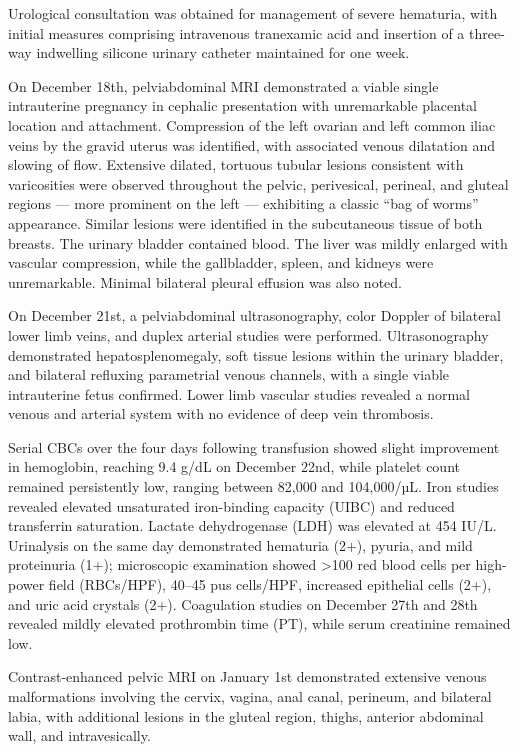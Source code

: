 \documentclass[
  letterpaper,
  DIV=11,
  numbers=noendperiod]{scrartcl}
\begin{document}
Urological consultation was obtained for management of severe hematuria,
with initial measures comprising intravenous tranexamic acid and
insertion of a three-way indwelling silicone urinary catheter maintained
for one week.

On December 18th, pelviabdominal MRI demonstrated a viable single
intrauterine pregnancy in cephalic presentation with unremarkable
placental location and attachment. Compression of the left ovarian and
left common iliac veins by the gravid uterus was identified, with
associated venous dilatation and slowing of flow. Extensive dilated,
tortuous tubular lesions consistent with varicosities were observed
throughout the pelvic, perivesical, perineal, and gluteal regions ---
more prominent on the left --- exhibiting a classic ``bag of worms''
appearance. Similar lesions were identified in the subcutaneous tissue
of both breasts. The urinary bladder contained blood. The liver was
mildly enlarged with vascular compression, while the gallbladder,
spleen, and kidneys were unremarkable. Minimal bilateral pleural
effusion was also noted.

On December 21st, a pelviabdominal ultrasonography, color Doppler of
bilateral lower limb veins, and duplex arterial studies were performed.
Ultrasonography demonstrated hepatosplenomegaly, soft tissue lesions
within the urinary bladder, and bilateral refluxing parametrial venous
channels, with a single viable intrauterine fetus confirmed. Lower limb
vascular studies revealed a normal venous and arterial system with no
evidence of deep vein thrombosis.

Serial CBCs over the four days following transfusion showed slight
improvement in hemoglobin, reaching 9.4 g/dL on December 22nd, while
platelet count remained persistently low, ranging between 82,000 and
104,000/µL. Iron studies revealed elevated unsaturated iron-binding
capacity (UIBC) and reduced transferrin saturation. Lactate
dehydrogenase (LDH) was elevated at 454 IU/L. Urinalysis on the same day
demonstrated hematuria (2+), pyuria, and mild proteinuria (1+);
microscopic examination showed \textgreater100 red blood cells per
high-power field (RBCs/HPF), 40--45 pus cells/HPF, increased epithelial
cells (2+), and uric acid crystals (2+). Coagulation studies on December
27th and 28th revealed mildly elevated prothrombin time (PT), while
serum creatinine remained low.

Contrast-enhanced pelvic MRI on January 1st demonstrated extensive
venous malformations involving the cervix, vagina, anal canal, perineum,
and bilateral labia, with additional lesions in the gluteal region,
thighs, anterior abdominal wall, and intravesically.
\end{document}

